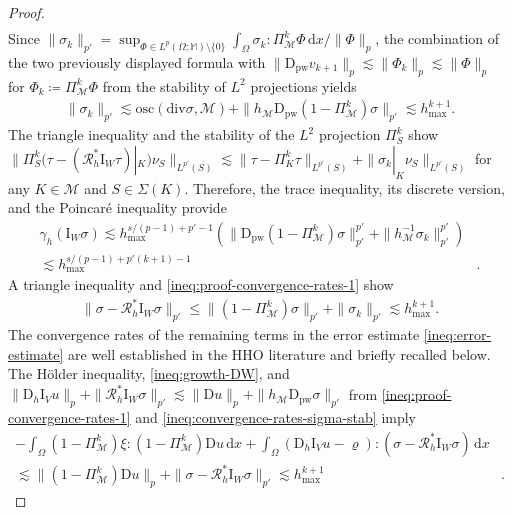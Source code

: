 \documentclass[a4paper]{amsart}
\numberwithin{equation}{section}
\renewcommand{\d}[1]{\,\mathrm{d}#1}
\renewcommand{\div}{\mathrm{div}}
\newcommand{\I}{\mathrm{I}}
\newcommand{\Mcal}{\mathcal{M}}
\newcommand{\pw}{\mathrm{pw}}
\newcommand{\D}{\mathrm{D}}
\newcommand{\M}{\mathbb{M}}
\newcommand{\osc}{\mathrm{osc}}
\theoremstyle{remark}
\begin{document}
\begin{proof}
\begin{align*}
	\end{align*}
	Since $\|\sigma_k\|_{p'} = \sup_{\Phi \in L^p(\Omega;\M)\setminus\{0\}} \int_\Omega \sigma_k : \Pi_\Mcal^k \Phi \d{x}/\|\Phi\|_{p}$, the combination of the two previously displayed formula with $\|\D_\pw v_{k+1}\|_p \lesssim \|\Phi_k\|_p \lesssim \|\Phi\|_p$ for $\Phi_k \coloneqq \Pi_{\Mcal}^k \Phi$ from the stability of $L^2$ projections yields
	\begin{align}\label{ineq:proof-convergence-rates-1}
		\|\sigma_k\|_{p'} \lesssim \osc(\div \sigma,\Mcal) + \|h_\mathcal{\Mcal}\D_\pw(1 - \Pi_\Mcal^k) \sigma\|_{p'} \lesssim h_{\max}^{k+1}.
	\end{align}
	The triangle inequality and the stability of the $L^2$ projection $\Pi_S^k$ show $\|\Pi_S^k (\tau - (\mathcal{R}^*_h \I_W \tau)|_K)\nu_S\|_{L^{p'}(S)} \lesssim \|\tau - \Pi_K^k \tau\|_{L^{p'}(S)} + \|\sigma_k|_K \nu_S\|_{L^{p'}(S)}$ for any $K \in \Mcal$ and $S \in \Sigma(K)$. Therefore, the trace inequality, its discrete version, and the Poincar\'e inequality provide
	\begin{align}\label{ineq:proof-convergence-rates-2}
		\gamma_h(\I_W \sigma) \lesssim h_{\max}^{s/(p-1)+p'-1}(\|\D_\pw(1 - \Pi_\Mcal^k) \sigma\|_{p'}^{p'} + \|h_\Mcal^{-1}\sigma_k\|_{p'}^{p'})&\nonumber\\
		\lesssim h^{s/(p-1)+p'(k+1)-1}_{\max}&.
	\end{align}
	A triangle inequality and 
	\eqref{ineq:proof-convergence-rates-1}
	show
	\begin{align}\label{ineq:convergence-rates-sigma-stab}
		\|\sigma - \mathcal{R}_h^* \I_W \sigma\|_{p'} \leq \|(1 - \Pi_\Mcal^k) \sigma\|_{p'} + \|\sigma_k\|_{p'} \lesssim h_\mathrm{max}^{k+1}.
	\end{align}
	The convergence rates of the remaining terms in the error estimate \eqref{ineq:error-estimate} are well established in the HHO literature \cite{DiPietroErn2012,DiPietroErnLemaire2014,DiPietroErn2015,DiPietroDroniou2017,DiPietroDroniou2020} and briefly recalled below. The H\"older inequality, \eqref{ineq:growth-DW}, and $\|\D_h \I_V u\|_p + \|\mathcal{R}_h^* \I_W \sigma\|_{p'} \lesssim \|\D u\|_p + \|h_\Mcal \D_\pw \sigma\|_{p'}$ from \eqref{ineq:proof-convergence-rates-1} and \eqref{ineq:convergence-rates-sigma-stab} imply
	\begin{align}
		-\int_\Omega (1 - \Pi_\Mcal^k) \xi:(1 - \Pi_\Mcal^k) \D u \d{x} + \int_\Omega (\D_h \I_V u - \varrho) : (\sigma - \mathcal{R}_h^* \I_W \sigma) \d{x}\nonumber&\\
		\lesssim \|(1 - \Pi_\Mcal^k) \D u\|_p + \|\sigma - \mathcal{R}_h^* \I_W \sigma\|_{p'} \lesssim h_{\max}^{k+1}&.

\end{align}
\end{proof}
\end{document}
